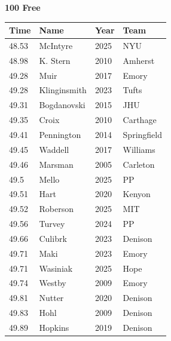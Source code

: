 \noindent\begin{minipage}[t]{0.98\textwidth}
\centering
\textbf{\textcolor{teamprimary}{100 Free}}\par
\vspace{0.5em}
\centering
\small
\renewcommand{\arraystretch}{1.0}
\setlength{\tabcolsep}{4pt}
\begin{tabular}{@{}p{2.5cm}p{4.5cm}p{1.5cm}p{2.5cm}@{}}
\toprule
\textbf{Time} & \textbf{Name} & \textbf{Year} & \textbf{Team} \\
\midrule
48.53 & McIntyre & 2025 & NYU \\
48.98 & K. Stern & 2010 & Amherst \\
49.28 & Muir & 2017 & Emory \\
49.28 & Klinginsmith & 2023 & Tufts \\
49.31 & Bogdanovski & 2015 & JHU \\
49.35 & Croix & 2010 & Carthage \\
49.41 & Pennington & 2014 & Springfield \\
49.45 & Waddell & 2017 & Williams \\
49.46 & Marsman & 2005 & Carleton \\
49.5 & Mello & 2025 & PP \\
49.51 & Hart & 2020 & Kenyon \\
49.52 & Roberson & 2025 & MIT \\
49.56 & Turvey & 2024 & PP \\
49.66 & Culibrk & 2023 & Denison \\
49.71 & Maki & 2023 & Emory \\
49.71 & Wasiniak & 2025 & Hope \\
49.74 & Westby & 2009 & Emory \\
49.81 & Nutter & 2020 & Denison \\
49.83 & Hohl & 2009 & Denison \\
49.89 & Hopkins & 2019 & Denison \\
\bottomrule
\end{tabular}
\end{minipage}
\vspace{1.2em}
